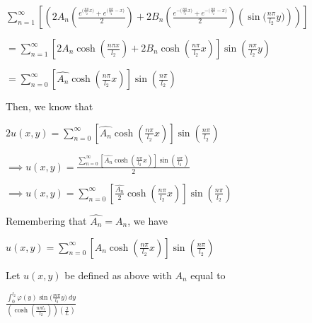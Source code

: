 \documentclass[executivepaper]{article}
\begin{document}
\begin{flushleft}
\begin{center}

$\sum_{n=1}^{\infty} \left[\left(2A_{n} \left(\frac{e^{\Big(\frac{n \pi}{l_{2}} x\Big)} + e^{\Big(\frac{n \pi}{l_{2}} -x\Big)}}{2} \right) + 2B_{n}\left(\frac{e^{-\Big(\frac{n \pi}{l_{2}} x\Big)} + e^{-\Big(\frac{n \pi}{l_{2}} -x\Big)}}{2} \right) \left(\sin\bigg(\frac{n \pi}{l_{2}} y\bigg)\right)\right)\right]$

\vspace{2mm}

$=\sum_{n=1}^{\infty} \left[ 2A_{n} \cosh\left(\frac{n \pi x}{l_{2}}\right) + 2B_{n} \cosh\left(\frac{n \pi}{l_{2}} x\right)\right] \sin\left(\frac{n \pi}{l_{2}} y\right)$

\vspace{2mm}

$=\sum_{n=0}^{\infty} \left[\hat{A_{n}} \cosh\left(\frac{n \pi}{l_{2}} x\right)\right] \sin\left(\frac{n \pi}{l_{2}}\right)$

\end{center}

Then, we know that

\begin{center}

$2u(x,y)=\sum_{n=0}^{\infty} \left[\hat{A_{n}} \cosh\left(\frac{n \pi}{l_{2}} x\right)\right] \sin\left(\frac{n \pi}{l_{2}}\right)$

\vspace{2mm}

$\implies u(x,y)=\frac{\sum_{n=0}^{\infty} \left[\hat{A_{n}} \cosh\left(\frac{n \pi}{l_{2}} x\right)\right] \sin\left(\frac{n \pi}{l_{2}}\right)}{2}$

\vspace{2mm}

$\implies u(x,y)=\sum_{n=0}^{\infty} \left[\frac{\hat{A_{n}}}{2} \cosh\left(\frac{n \pi}{l_{2}} x\right)\right] \sin\left(\frac{n \pi}{l_{2}}\right)$

\end{center}

Remembering that $\hat{A_{n}}=A_{n}$, we have

\begin{center}

$u(x,y)=\sum_{n=0}^{\infty} \left[A_{n} \cosh\left(\frac{n \pi}{l_{2}} x\right)\right] \sin\left(\frac{n \pi}{l_{2}}\right)$

\end{center}

Let $u(x,y)$ be defined as above with $A_{n}$ equal to

\begin{center}

$\frac{\int_{0}^{l_{2}} \varphi(y) \sin\bigg(\frac{m \pi}{l_{2}} y\bigg) \ dy}{\left(\cosh\left(\frac{n \pi l_{1}}{l_{2}}\right)\right) \left(\frac{2}{L}\right)}$

\end{center}

\end{flushleft}
\end{document}
